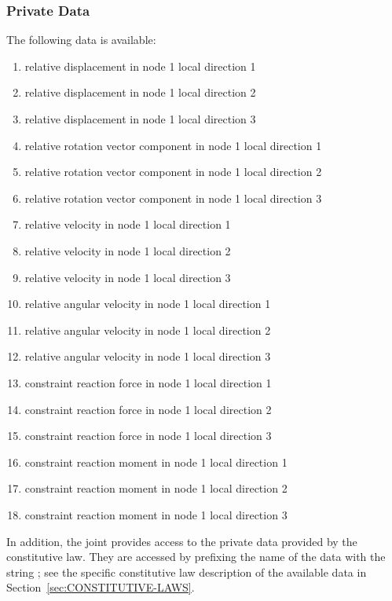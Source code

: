 \subsubsection{Private Data}
The following data is available:
\begin{enumerate}
\item {} relative displacement in node 1 local direction 1
\item {} relative displacement in node 1 local direction 2
\item {} relative displacement in node 1 local direction 3
\item {} relative rotation vector component in node 1 local direction 1
\item {} relative rotation vector component in node 1 local direction 2
\item {} relative rotation vector component in node 1 local direction 3
\item {} relative velocity in node 1 local direction 1
\item {} relative velocity in node 1 local direction 2
\item {} relative velocity in node 1 local direction 3
\item {} relative angular velocity in node 1 local direction 1
\item {} relative angular velocity in node 1 local direction 2
\item {} relative angular velocity in node 1 local direction 3
\item {} constraint reaction force in node 1 local direction 1
\item {} constraint reaction force in node 1 local direction 2
\item {} constraint reaction force in node 1 local direction 3
\item {} constraint reaction moment in node 1 local direction 1
\item {} constraint reaction moment in node 1 local direction 2
\item {} constraint reaction moment in node 1 local direction 3
\end{enumerate}
In addition, the joint provides
access to the private data provided by the constitutive law.
They are accessed by prefixing the name of the data with the string
; see the specific constitutive law
description of the available data in Section~\ref{sec:CONSTITUTIVE-LAWS}.

